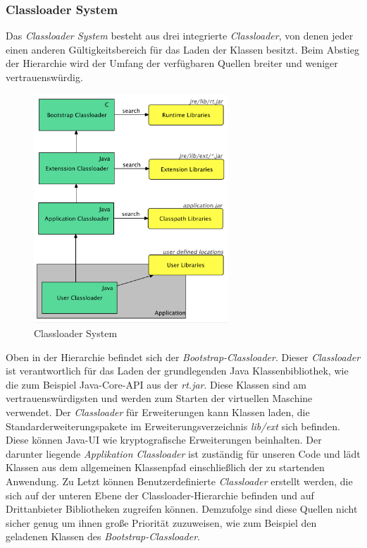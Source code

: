 \subsubsection{Classloader System}
Das \textit{Classloader System} besteht aus drei integrierte \textit{Classloader}, von denen jeder einen anderen Gültigkeitsbereich für das Laden der Klassen besitzt. Beim Abstieg der Hierarchie wird der Umfang der verfügbaren Quellen breiter und weniger vertrauenswürdig.
\begin{figure}[h!]
  \centering
  \includegraphics[width=0.65\textwidth]{material/images/Classloader.png}
  \caption{Classloader System}
  \label{fig:Classloader}
\end{figure}
\newline
Oben in der Hierarchie befindet sich der \textit{Bootstrap-Classloader}. Dieser \textit{Classloader} ist verantwortlich für das Laden der grundlegenden Java Klassenbibliothek, wie die zum Beispiel Java-Core-API aus der \textit{rt.jar}. Diese Klassen sind am vertrauenswürdigsten und werden zum Starten der virtuellen Maschine verwendet. Der \textit{Classloader} für Erweiterungen kann Klassen laden, die Standarderweiterungspakete im Erweiterungsverzeichnis \textit{lib/ext} sich befinden. Diese können Java-UI wie kryptografische Erweiterungen beinhalten. Der darunter liegende \textit{Applikation Classloader} ist zuständig für unseren Code und lädt Klassen aus dem allgemeinen Klassenpfad einschließlich der zu startenden Anwendung. Zu Letzt können Benutzerdefinierte \textit{Classloader} erstellt werden, die sich auf der unteren Ebene der Classloader-Hierarchie befinden und auf Drittanbieter Bibliotheken zugreifen können. Demzufolge sind diese Quellen nicht sicher genug um ihnen große Priorität zuzuweisen, wie zum Beispiel den geladenen Klassen des \textit{Bootstrap-Classloader}. 
  
